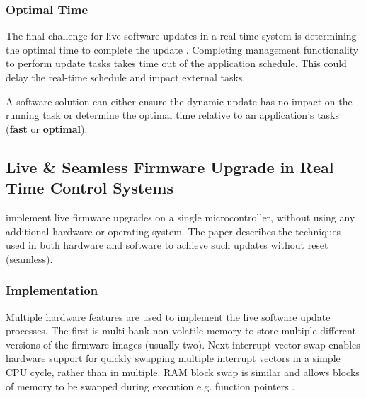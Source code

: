 \subsubsection{Optimal Time} \label{sec:optimal}

The final challenge for live software updates in a real-time system is determining the optimal time to complete the update \autocite{mlinaricChallengesDynamicSoftware2020}. Completing management functionality to perform update tasks takes time out of the application schedule. This could delay the real-time schedule and impact external tasks.

A software solution can either ensure the dynamic update has no impact on the running task or determine the optimal time relative to an application's tasks (\textbf{fast} or \textbf{optimal}).

\newpage


\subsection{Live \& Seamless Firmware Upgrade in Real Time Control Systems} \label{caseStudy1}
\textcite{raoLiveSeamlessFirmware2023} implement live firmware upgrades on a single microcontroller, without using any additional hardware or operating system. The paper describes the techniques used in both hardware and software to achieve such updates without reset (seamless).

\subsubsection{Implementation}



Multiple hardware features are used to implement the live software update processes. The first is multi-bank non-volatile memory to store multiple different versions of the firmware images (usually two). Next interrupt vector swap enables hardware support for quickly swapping multiple interrupt vectors in a simple CPU cycle, rather than in multiple. RAM block swap is similar and allows blocks of memory to be swapped during execution e.g. function pointers \autocite{raoLiveSeamlessFirmware2023}.

